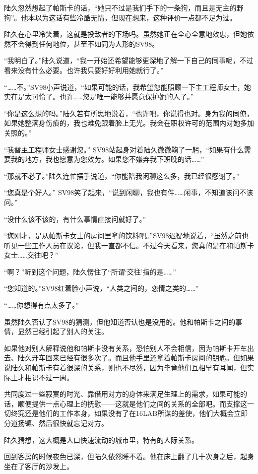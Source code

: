 陆久忽然想起了帕斯卡的话，“她只不过是我们手下的一条狗，而且是无主的野狗”。他本以为这话有些冷酷无情，但现在想来，这种评价一点都不足为过。

陆久在心里冷笑着，这就是投敌者的下场吗。虽然她正在全心全意地效忠，但她依然不会得到任何地位，甚至不如同为人形的SV98。

“我明白了。”陆久说道，“我一开始还希望能够更深地了解一下自己的同事呢，不过看来没有什么必要。也许我只要好好利用她就行了。”

“……不。”SV98小声说道，“如果可能的话，我希望您能照顾一下主工程师女士，她实在是太可怜了。也许……您是唯一能够并愿意保护她的人了。”

“你是这么想的吗。”陆久若有所思地说着，“也许吧，你说得也对。身为我的同僚，如果她整满身伤痕的，我也难免跟着脸上无光。我会在职权许可的范围内对她多加关照的。”

“我替主工程师女士感谢您。” SV98站起身对着陆久微微鞠了一躬，“如果有什么需要我的地方，我也愿意为您效劳。如果您不嫌弃我下班晚的话……”

“那就不必了。”陆久连忙摆手说道，“你能陪我闲聊这么多，我已经很感谢了。”

“您真是个好人。” SV98笑了起来，“说到闲聊，我也有件……闲事，不知道该问不该问。”

“没什么该不该的，有什么事情直接问就好了。”

“您刚才，是从帕斯卡女士的房间里拿的饮料吧。”SV98迟疑地说着，“虽然之前也听见一些工作人员在议论，但我一直都不信。不过今天看来，您真的是在和帕斯卡女士……交往吧？”

“啊？”听到这个问题，陆久愣住了“所谓‘交往’指的是……”

“您知道的。”SV98红着脸小声说，“人类之间的，恋情之类的……”

“……你想得有点太多了。”

虽然陆久否认了SV98的猜测，但他知道否认也是没用的。他和帕斯卡之间的事情，显然已经引起了别人的关注。

如果他对别人解释说他和帕斯卡没有关系，恐怕别人不会相信，因为帕斯卡开车出去、陆久开车回来已经有很多次了。而且他手里还拿着帕斯卡房间的钥匙。但如果说陆久和帕斯卡有着很深的关系，则也不尽然，因为毕竟他们互相早有耳闻，但实际上才相识不过一周。

共同度过一些寂寞的时光、靠借用对方的身体来满足生理上的需求，如果可能的话，顺便提供一点心理上的抚慰——这就是他们之间的关系的全部吧。而支撑这一切终究还是他们的工作本身，如果没有了在16LAB所谋的差使，他们大概会立即分道扬镳、然后很快就忘记对方。

陆久猜想，这大概是人口快速流动的城市里，特有的人际关系。

回到客房的时候夜色已深，但陆久依然睡不着。他在床上翻了几十次身之后，起身坐在了客厅的沙发上。

